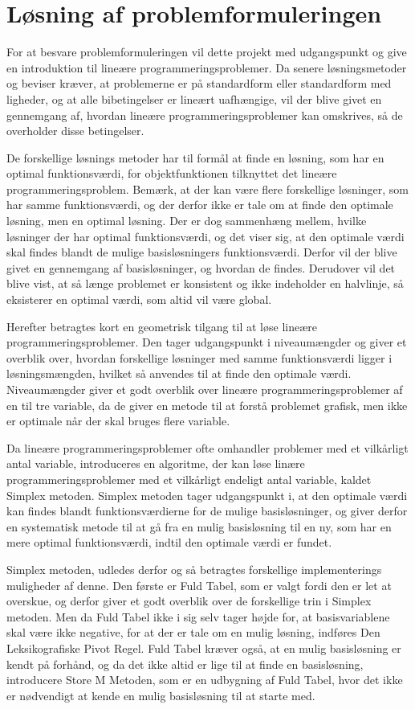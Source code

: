 \section{Løsning af problemformuleringen}
For at besvare problemformuleringen vil dette projekt med udgangspunkt \citep{bert} og \citep{lay} give en introduktion til lineære programmeringsproblemer. 
Da senere løsningsmetoder og beviser kræver, at problemerne er på standardform eller standardform med ligheder, og at alle bibetingelser er lineært uafhængige, vil der blive givet en gennemgang af, hvordan lineære programmeringsproblemer kan omskrives, så de overholder disse betingelser.

De forskellige løsnings metoder har til formål at finde en løsning, som har en optimal funktionsværdi, for objektfunktionen tilknyttet det lineære programmeringsproblem.
Bemærk, at der kan være flere forskellige løsninger, som har samme funktionsværdi, og der derfor ikke er tale om at finde den optimale løsning, men en optimal løsning. 
Der er dog sammenhæng mellem, hvilke løsninger der har optimal funktionsværdi, og det viser sig, at den optimale værdi skal findes blandt de mulige basisløsningers funktionsværdi. 
Derfor vil der blive givet en gennemgang af basisløsninger, og hvordan de findes.
Derudover vil det blive vist, at så længe problemet er konsistent og ikke indeholder en halvlinje, så eksisterer en optimal værdi, som altid vil være global.

Herefter betragtes kort en geometrisk tilgang til at løse lineære programmeringsproblemer.
Den tager udgangspunkt i niveaumængder og giver et overblik over, hvordan forskellige løsninger med samme funktionsværdi ligger i løsningsmængden, hvilket så anvendes til at finde den optimale værdi. 
Niveaumængder giver et godt overblik over lineære programmeringsproblemer af en til tre variable, da de giver en metode til at forstå problemet grafisk, men ikke er optimale når der skal bruges flere variable.

Da lineære programmeringsproblemer ofte omhandler problemer med et vilkårligt antal variable, introduceres en algoritme, der kan løse linære programmeringsproblemer med et vilkårligt endeligt antal variable, kaldet Simplex metoden.
Simplex metoden tager udgangspunkt i, at den optimale værdi kan findes blandt funktionsværdierne for de mulige basisløsninger, og giver derfor en systematisk metode til at gå fra en mulig basisløsning til en ny, som har en mere optimal funktionsværdi, indtil den optimale værdi er fundet.

Simplex metoden, udledes derfor og så betragtes forskellige implementerings muligheder af denne.
Den første er Fuld Tabel, som er valgt fordi den er let at overskue, og derfor giver et godt overblik over de forskellige trin i Simplex metoden.
Men da Fuld Tabel ikke i sig selv tager højde for, at basisvariablene skal være ikke negative, for at der er tale om en mulig løsning, indføres Den Leksikografiske Pivot Regel.
Fuld Tabel kræver også, at en mulig basisløsning er kendt på forhånd, og da det ikke altid er lige til at finde en basisløsning, introducere Store M Metoden, som er en udbygning af Fuld Tabel, hvor det ikke er nødvendigt at kende en mulig basisløsning til at starte med.

